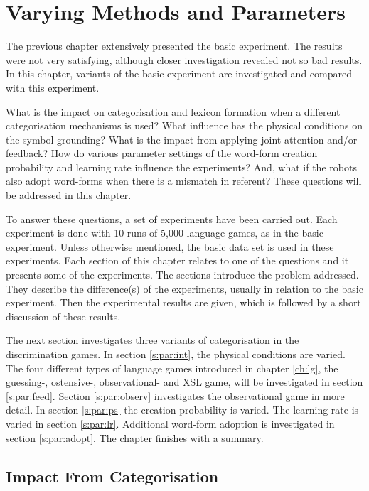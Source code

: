 \chapter{Varying Methods and Parameters}\label{ch:lex}\label{ch:cat}\label{ch:interaction}\label{ch:feedback}\label{ch:par}

The previous chapter extensively presented the basic experiment. The results were not very satisfying, although closer investigation revealed not so bad results. In this chapter, variants of the basic experiment are investigated and compared with this experiment.

What is the impact on categorisation and lexicon formation when a different categorisation mechanisms is used? What influence has the physical conditions on the symbol grounding? What is the impact from applying joint attention and/or feedback? How do various parameter settings of the word-form creation probability and learning rate influence the experiments? And, what if the robots also adopt word-forms when there is a mismatch in referent? These questions will be addressed in this chapter.

To answer these questions, a set of experiments have been carried out. Each experiment is done with 10 runs of 5,000 language games, as in the basic experiment. Unless otherwise mentioned, the basic data set is used in these experiments. Each section of this chapter relates to one of the questions and it presents some of the experiments. The sections introduce the problem addressed. They describe the difference(s) of the experiments, usually in relation to the basic experiment. Then the experimental results are given, which is followed by a short discussion of these results.


The next section investigates three variants of categorisation in the discrimination games. In section \ref{s:par:int}, the physical conditions are varied. The four different types of language games introduced in chapter \ref{ch:lg}, the guessing-, ostensive-, observational- and XSL game, will be investigated in section \ref{s:par:feed}. Section \ref{s:par:observ} investigates the observational game in more detail. In section \ref{s:par:ps} the creation probability is varied. The learning rate is varied in section \ref{s:par:lr}. Additional word-form adoption is investigated in section \ref{s:par:adopt}. The chapter finishes with a summary.

\section{Impact From Categorisation}\label{s:par:cat}

